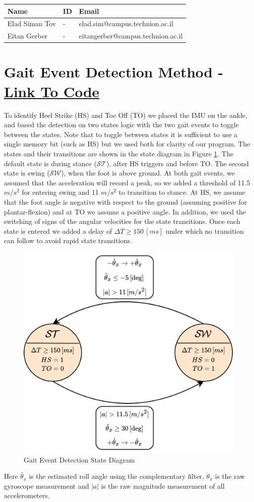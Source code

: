 \documentclass[10pt]{article}
\begin{document}
\begin{table}[h]
    \centering
    \begin{tabular}{l l l}
        \hline
        Name & ID & Email \\
        \hline
        Elad Siman Tov & - & elad.sim@campus.technion.ac.il \\
        \hline
        Eitan Gerber & - & eitangerber@campus.technion.ac.il \\
        \hline
    \end{tabular}
    \label{tab:personal_info}
\end{table}

\section{Gait Event Detection Method - \href{https://github.com/eladsimantov/Wearable-Robotics/blob/main/HW2/gaitEventDetector.ino}{Link To Code}}
To identify Heel Strike (HS) and Toe Off (TO) we placed the IMU on the ankle, and based the detection on two states logic with the two gait events to toggle between the states. Note that to toggle between states it is sufficient to use a single memory bit (such as HS) but we used both for clarity of our program. The states and their transitions are shown in the state diagram in Figure \ref{fig:stateDiagram}.
The default state is during stance ($\mathcal{ST}$), after HS triggers and before TO. The second state is swing ($\mathcal{SW}$), when the foot is above ground.  
At both gait events, we assumed that the acceleration will record a peak, so we added a threshold of 11.5 $m/s^2$ for entering swing and 11 $m/s^2$ to transition to stance. At HS, we assume that the foot angle is negative with respect to the ground (assuming positive for plantar-flexion) and at TO we assume a positive angle. In addition, we used the switching of signs of the angular velocities for the state transitions. Once each state is entered we added a delay of $\Delta T\ge150\,[ms]$ under which no transition can follow to avoid rapid state transitions. 
\begin{figure}[H]
    \centering
    \includegraphics[width=0.5\linewidth]{stateDiagram.png}
    \caption{Gait Event Detection State Diagram}
    \label{fig:stateDiagram}
\end{figure}
Here $\hat \theta_x$ is the estimated roll angle using the complementary filter, $\dot \theta_x$ is the raw gyroscope measurement and $|a|$ is the raw magnitude measurement of all accelerometers.
\end{document}
